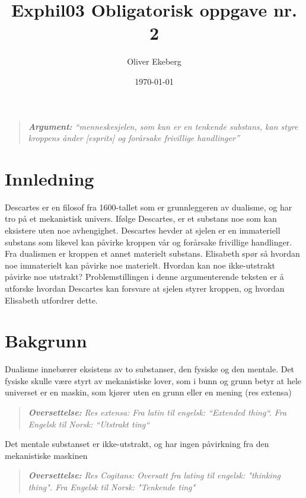 \documentclass[12pt, a4paper]{article}
\title{Exphil03 Obligatorisk oppgave nr. 2}
\author{Oliver Ekeberg}
\date{\today}
\newenvironment{argument}{\begin{quote}\itshape\textbf{Argument: }}{\end{quote}}
\newenvironment{oversettelse}{\begin{quote}\itshape\textbf{Oversettelse: }}{\end{quote}}
\begin{document}
\maketitle

\tableofcontents

\begin{argument}
    ``menneskesjelen, som kun er en tenkende substans, kan styre kroppens ånder [esprits] og forårsake frivillige handlinger''
\end{argument}

\section{Innledning}

Descartes er en filosof fra 1600-tallet som er grunnleggeren av dualisme, og har tro på et mekanistisk univers. Ifølge Descartes, er et substans noe som kan eksistere uten noe avhengighet. Descartes hevder at sjelen er en immateriell substans som likevel kan påvirke kroppen vår og forårsake frivillige handlinger. Fra dualismen er kroppen et annet materielt substans. Elisabeth spør så hvordan noe immaterielt kan påvirke noe materielt. Hvordan kan noe ikke-utstrakt påvirke noe utstrakt? Problemstillingen i denne argumenterende teksten er å utforske hvordan Descartes kan forsvare at sjelen styrer kroppen, og hvordan Elisabeth utfordrer dette.

\section{Bakgrunn}

Dualisme innebærer eksistens av to substanser, den fysiske og den mentale. Det fysiske skulle være styrt av mekanistiske lover, som i bunn og grunn betyr at hele universet er en maskin, som kjører uten en grunn eller en mening (res extensa)

\begin{oversettelse}
    Res extensa: Fra latin til engelsk: ``Extended thing``. Fra Engelsk til Norsk: ``Utstrakt ting``
\end{oversettelse}

Det mentale substanset er ikke-utstrakt, og har ingen påvirkning fra den mekanistiske maskinen

\begin{oversettelse}
    Res Cogitans: Oversatt fra lating til engelsk: "thinking thing". Fra Engelsk til Norsk: "Tenkende ting" 
\end{oversettelse}
\end{document}
